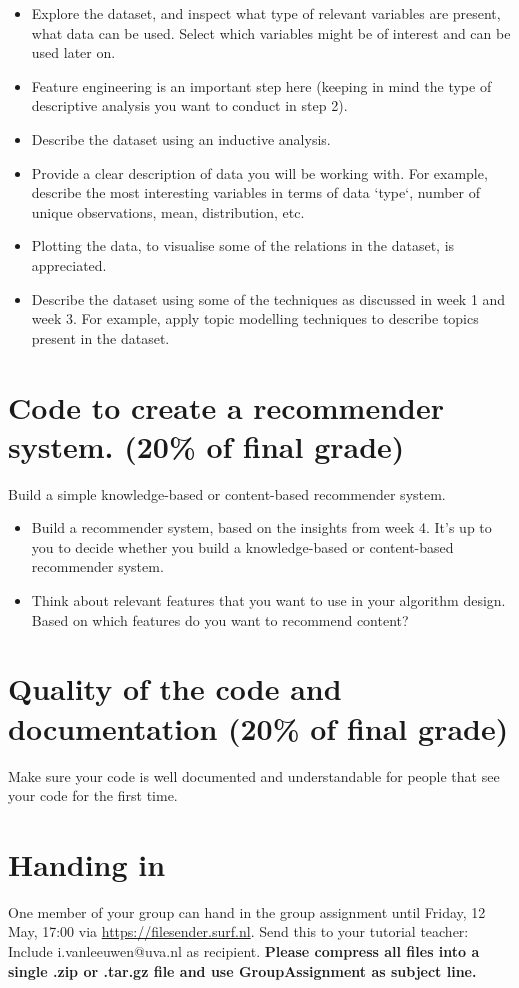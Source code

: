 \begin{itemize}
	\item Explore the dataset, and inspect what type of relevant variables are present, what data can be used. Select which variables might be of interest and can be used later on.
	\item Feature engineering is an important step here (keeping in mind the type of descriptive analysis you want to conduct in step 2). 
	\item Describe the dataset using an inductive analysis.
	\item Provide a clear description of data you will be working with. For example, describe the most interesting variables in terms of data `type`, number of unique observations, mean, distribution, etc.
	\item Plotting the data, to visualise some of the relations in the dataset, is appreciated.
	\item Describe the dataset using some of the techniques as discussed in week 1 and week 3. For example, apply topic modelling techniques to describe topics present in the dataset.
\end{itemize}

\section{Code to create a recommender system. (20\% of final grade)}

Build a simple knowledge-based or content-based recommender system. 

\begin{itemize}
	\item Build a recommender system, based on the insights from week 4. It's up to you to decide whether you build a knowledge-based or content-based recommender system.
	\item Think about relevant features that you want to use in your algorithm design. Based on which features do you want to recommend content?
\end{itemize}

\section{Quality of the code and documentation (20\% of final grade)}

Make sure your code is well documented and understandable for people that see your code for the first time. 

\section{Handing in}
One member of your group can hand in the group assignment until Friday, 12 May, 17:00 via \url{https://filesender.surf.nl}. Send this to your tutorial teacher: Include i.vanleeuwen@uva.nl as recipient. \textbf{Please compress all files into a single .zip or .tar.gz file and use GroupAssignment as subject line.} 


